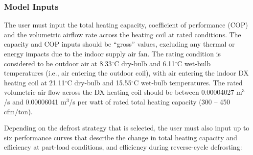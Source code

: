 \subsubsection{Model Inputs}\label{model-inputs-2}

The user must input the total heating capacity, coefficient of performance (COP) and the volumetric airflow rate across the heating coil at rated conditions. The capacity and COP inputs should be ``gross'' values, excluding any thermal or energy impacts due to the indoor supply air fan. The rating condition is considered to be outdoor air at 8.33\(^{\circ}\)C dry-bulb and 6.11\(^{\circ}\)C wet-bulb temperatures (i.e., air entering the outdoor coil), with air entering the indoor DX heating coil at 21.11\(^{\circ}\)C dry-bulb and 15.55\(^{\circ}\)C wet-bulb temperatures. The rated volumetric air flow across the DX heating coil should be between 0.00004027 m\(^{3}\)/s and 0.00006041 m\(^{3}\)/s per watt of rated total heating capacity (300 -- 450 cfm/ton).

Depending on the defrost strategy that is selected, the user must also input up to six performance curves that describe the change in total heating capacity and efficiency at part-load conditions, and efficiency during reverse-cycle defrosting:

